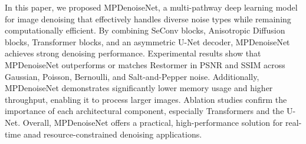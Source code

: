 In this paper, we proposed MPDenoiseNet, a multi-pathway deep learning model for image denoising that effectively handles diverse noise types while remaining computationally efficient. By combining SeConv blocks, Anisotropic Diffusion blocks, Transformer blocks, and an asymmetric U-Net decoder, MPDenoiseNet achieves strong denoising performance. Experimental results show that MPDenoiseNet outperforms or matches Restormer in PSNR and SSIM across Gaussian, Poisson, Bernoulli, and Salt-and-Pepper noise. Additionally, MPDenoiseNet demonstrates significantly lower memory usage and higher throughput, enabling it to process larger images. Ablation studies confirm the importance of each architectural component, especially Transformers and the U-Net. Overall, MPDenoiseNet offers a practical, high-performance solution for real-time anad resource-constrained denoising applications.